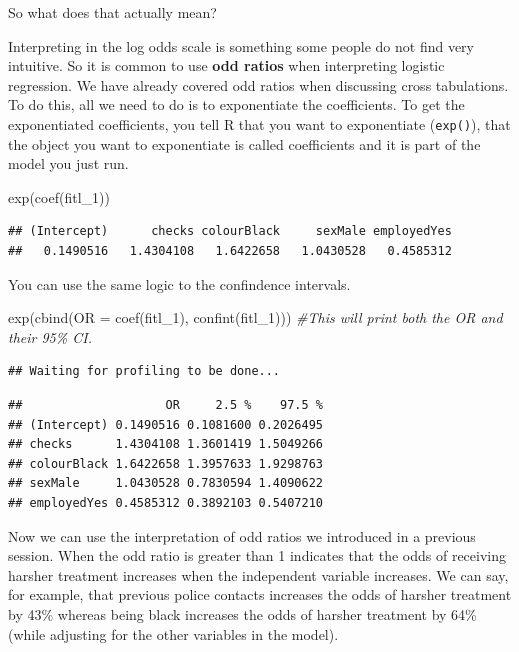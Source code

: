 \documentclass[
]{book}
\newenvironment{Shaded}{\begin{snugshade}}{\end{snugshade}}
\newcommand{\AttributeTok}[1]{\textcolor[rgb]{0.77,0.63,0.00}{#1}}
\newcommand{\CommentTok}[1]{\textcolor[rgb]{0.56,0.35,0.01}{\textit{#1}}}
\newcommand{\FunctionTok}[1]{\textcolor[rgb]{0.00,0.00,0.00}{#1}}
\newcommand{\NormalTok}[1]{#1}
\begin{document}
So what does that actually mean?

Interpreting in the log odds scale is something some people do not find very intuitive. So it is common to use \textbf{odd ratios} when interpreting logistic regression. We have already covered odd ratios when discussing cross tabulations. To do this, all we need to do is to exponentiate the coefficients. To get the exponentiated coefficients, you tell R that you want to exponentiate (\texttt{exp()}), that the object you want to exponentiate is called coefficients and it is part of the model you just run.

\begin{Shaded}
\begin{Highlighting}[]
\FunctionTok{exp}\NormalTok{(}\FunctionTok{coef}\NormalTok{(fitl\_1))}
\end{Highlighting}
\end{Shaded}

\begin{verbatim}
## (Intercept)      checks colourBlack     sexMale employedYes 
##   0.1490516   1.4304108   1.6422658   1.0430528   0.4585312
\end{verbatim}

You can use the same logic to the confindence intervals.

\begin{Shaded}
\begin{Highlighting}[]
\FunctionTok{exp}\NormalTok{(}\FunctionTok{cbind}\NormalTok{(}\AttributeTok{OR =} \FunctionTok{coef}\NormalTok{(fitl\_1), }\FunctionTok{confint}\NormalTok{(fitl\_1))) }\CommentTok{\#This will print both the OR and their 95\% CI.}
\end{Highlighting}
\end{Shaded}

\begin{verbatim}
## Waiting for profiling to be done...
\end{verbatim}

\begin{verbatim}
##                    OR     2.5 %    97.5 %
## (Intercept) 0.1490516 0.1081600 0.2026495
## checks      1.4304108 1.3601419 1.5049266
## colourBlack 1.6422658 1.3957633 1.9298763
## sexMale     1.0430528 0.7830594 1.4090622
## employedYes 0.4585312 0.3892103 0.5407210
\end{verbatim}

Now we can use the interpretation of odd ratios we introduced in a previous session. When the odd ratio is greater than 1 indicates that the odds of receiving harsher treatment increases when the independent variable increases. We can say, for example, that previous police contacts increases the odds of harsher treatment by 43\% whereas being black increases the odds of harsher treatment by 64\% (while adjusting for the other variables in the model).
\end{document}
